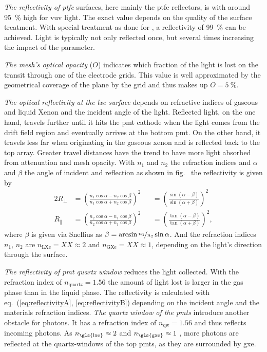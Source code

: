 \emph{The reflectivity of \gls{ptfe}} surfaces, here mainly the \gls{ptfe} reflectors, is with around \SI{95}{\%} high for \gls{vuv} light.
The exact value depends on the quality of the surface treatment.
With special treatment as done for \oneton, a reflectivity of \SI{99}{\%} can be achieved\cite{}. %
Light is typically not only reflected once, but several times increasing the impact of the parameter.


\emph{The mesh's optical opacity} ($ O $) indicates which fraction of the light is lost on the transit through one of the electrode grids.
This value is well approximated by the geometrical coverage of the plane by the grid and thus makes up $ O = \SI{5}{\%} $.


\emph{The optical reflectivity at the \gls{lxe} surface} depends on refractive indices of gaseous and liquid Xenon and the incident angle of the light.
Reflected light, on the one hand, travels further until it hits the \gls{pmt} cathode when the light comes from the drift field region and eventually arrives at the bottom \gls{pmt}.
On the other hand, it travels less far when originating in the gaseous xenon and is reflected back to the top array.
Greater travel distances have the trend to have more light absorbed from attenuation and mesh opacity.
With $ n_1 $ and $ n_2 $ the refraction indices and $ \alpha $ and $ \beta $ the angle of incident and reflection as shown in fig.~%
the reflectivity is given by~\cite{}  %
\begin{alignat}{2}
    \label{eq:reflectivityA}
    R_\perp &= \left( \frac{ n_1 \cos{\alpha} - n_2 \cos{\beta} }{ n_1 \cos{\alpha} + n_2 \cos{\beta} } \right)^2 &
            &=  \left( \frac{ \sin{\left( \alpha-\beta \right)}}{ \sin{\left( \alpha+\beta \right)} } \right)^2 \\
    R_\parallel &= \left( \frac{ n_2 \cos{\alpha} - n_1 \cos{\beta} }{ n_2 \cos{\alpha} + n_1 \cos{\beta} } \right)^2 &
                &=  \left( \frac{ \tan{\left( \alpha-\beta \right)}}{ \tan{\left( \alpha+\beta \right)} } \right)^2,
    \label{eq:reflectivityB}
\end{alignat}
where $ \beta $ is given via Snellius as $ \beta = \arcsin{\nicefrac{n_1}{n_2} \sin{\alpha} } $.
And the refraction indices $ n_1 $, $ n_2 $ are $ n_\mathrm{LXe} = XX \approx 2 $ and $ n_\mathrm{GXe} = XX \approx 1 $, depending on the light's direction through the surface.

\emph{The reflectivity of \gls{pmt} quartz window} reduces the light collected. With the refraction index of $ n_\mathrm{quartz} = 1.56 $ the amount of light lost is larger in the gas phase than in the liquid phase. The reflectivity is calculated with eq.~(\ref{eq:reflectivityA}, \ref{eq:reflectivityB}) depending on the incident angle and the materials refraction indices.
\emph{The quartz window of the \glspl{pmt}} introduce another obstacle for photons.
It has a refraction index of $ n_\mathrm{qw} = 1.56 $ and thus reflects incoming photons.
As $ n_\mathrm{\gls{lxe}} \approx 2 $ and $ n_\mathrm{\gls{gxe}} \approx 1 $ , more photons are reflected at the quartz-windows of the top \glspl{pmt}, as they are surrounded by \gls{gxe}.


